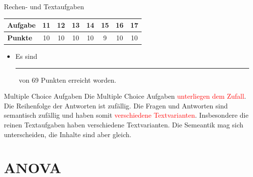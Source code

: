 \documentclass[a4paper, 9pt]{scrartcl}\usepackage[]{graphicx}\usepackage[]{xcolor}
\begin{document}
\begin{graybox}{Rechen- und Textaufgaben}
  \begin{center}
    \large
    \begin{tabular}{|l|c|c|c|c|c|c|c|}
      \hline
      \textbf{Aufgabe} & \textbf{11} & \textbf{12} & \textbf{13} & \textbf{14} & \textbf{15} & \textbf{16} & \textbf{17} \strut\\
      \hline
      \textbf{Punkte} & 
      \hspace{1Ex}\Large\textcolor{gray!70}{10}\hspace{1Ex}  & 
      \hspace{1Ex}\Large\textcolor{gray!70}{10}\hspace{1Ex}  & 
      \hspace{1Ex}\Large\textcolor{gray!70}{10}\hspace{1Ex}  & 
      \hspace{1Ex}\Large\textcolor{gray!70}{10}\hspace{1Ex}  & 
      \hspace{1Ex}\Large\textcolor{gray!70}{9}\hspace{1Ex}  & 
      \hspace{1Ex}\Large\textcolor{gray!70}{10}\hspace{1Ex}  & 
      \hspace{1Ex}\Large\textcolor{gray!70}{10}\hspace{1Ex} \strut\\
      \hline
  \end{tabular}
\end{center}
\begin{itemize}
\item Es sind \rule[0ex]{2em}{.4pt}\, von 69 Punkten erreicht worden.
\end{itemize}
\end{graybox}

\clearpage
\begin{graybox}{Multiple Choice Aufgaben}
Die Multiple Choice Aufgaben \textcolor{red}{unterliegen dem Zufall}. Die Reihenfolge der Antworten ist zufällig. Die Fragen und Antworten sind semantisch zufällig und haben somit \textcolor{red}{verschiedene Textvarianten}. Insbesondere die reinen Textaufgaben haben verschiedene Textvarianten. Die Semeantik mag sich unterscheiden, die Inhalte sind aber gleich.
\end{graybox}
\section*{ANOVA}
\end{document}
